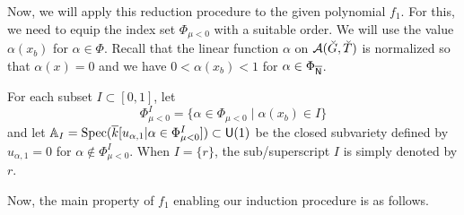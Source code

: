 \documentclass[12pt,reqno]{amsart}
\begin{document}
Now, we will apply this reduction procedure to the given polynomial $f_1$. For this, we need to equip the index set $\Phi_{\mu < 0}$ with a suitable order. We will use the value $\alpha(x_b)$ for $\alpha \in \Phi$. Recall that the linear function $\alpha$ on ${\mathcal{A}}(\breve{G}, \breve{T})$ is normalized so that $\alpha(x) = 0$ and we have $0 < \alpha(x_b) < 1$ for $\alpha \in \Phi_{{\mathsf{{\overline{N}}}}}$. 

\begin{defi}
    For each subset $I \subset [0, 1]$, let 
    \[
        \Phi_{\mu < 0}^{I} = \{ \alpha \in \Phi_{\mu < 0} \mid \alpha(x_b) \in I \}
    \]
    and let 
    $
    \mathbb{A}_{I} = {\operatorname{Spec}}({\overline{k}}[u_{\alpha, 1} \vert \alpha \in \Phi_{\mu < 0}^{I}]) \subset {\mathsf{U}}(1)
    $
    be the closed subvariety defined by $u_{\alpha, 1} = 0$ for $\alpha \notin \Phi_{\mu < 0}^{I}$. When $I = \{r\}$, the sub/superscript $I$ is simply denoted by $r$. 
\end{defi}

Now, the main property of $f_1$ enabling our induction procedure is as follows. 
\end{document}

